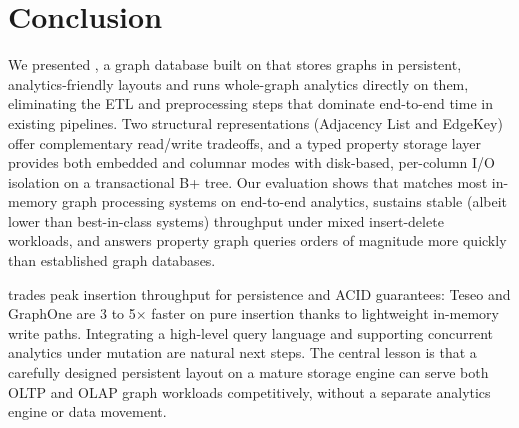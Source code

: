 \chapter{Conclusion}
\label{sec:conclusion}

We presented \project{}, a graph database built on \wt{} that stores graphs in persistent, analytics-friendly layouts and runs whole-graph analytics directly on them, eliminating the ETL and preprocessing steps that dominate end-to-end time in existing pipelines.
Two structural representations (Adjacency List and EdgeKey) offer complementary read/write tradeoffs, and a typed property storage layer provides both embedded and columnar modes with disk-based, per-column I/O isolation on a transactional B+ tree.
Our evaluation shows that \project{} matches most in-memory graph processing systems on end-to-end analytics, sustains stable (albeit lower than best-in-class systems) throughput under mixed insert-delete workloads, and answers property graph queries orders of magnitude more quickly than established graph databases.

\project{} trades peak insertion throughput for persistence and ACID guarantees: Teseo and GraphOne are 3 to 5$\times$ faster on pure insertion thanks to lightweight in-memory write paths.
Integrating a high-level query language and supporting concurrent analytics under mutation are natural next steps.
The central lesson is that a carefully designed persistent layout on a mature storage engine can serve both OLTP and OLAP graph workloads competitively, without a separate analytics engine or data movement.